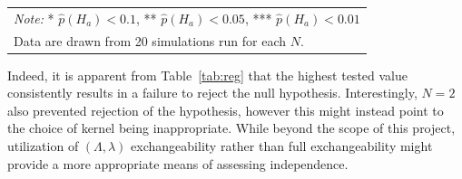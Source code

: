 \begin{table}
\begin{tabular}{|c|c|c|c|}
    \end{tabular}

    \begin{tabular}{p{10cm}}
        \textit{Note:} * $\hat{p}(H_{a}) < 0.1$, ** $\hat{p}(H_{a}) < 0.05$, *** $\hat{p}(H_{a}) < 0.01$
        \\
        Data are drawn from 20 simulations run for each $N$.
    \end{tabular}
\end{table}

Indeed, it is apparent from Table~\ref{tab:reg} that the highest tested value consistently results in a failure to reject
the null hypothesis.
Interestingly, $N=2$ also prevented rejection of the hypothesis, however this might instead point to
the choice of kernel being inappropriate.
While beyond the scope of this project, utilization of $(\Lambda,\lambda)$ exchangeability
rather than full exchangeability might provide a more appropriate means of assessing independence.

